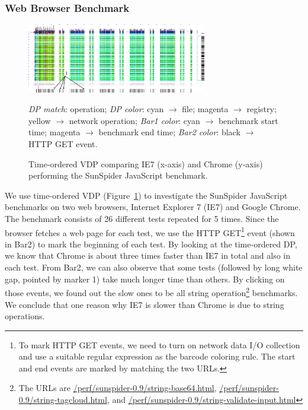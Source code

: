 \subsubsection{Web Browser Benchmark}
\label{sec:wbbench}

\begin{figure}[htb]
\begin{center}
\includegraphics[width=0.7\textwidth]{lviz/wbbench-dp.png}
\end{center}
\caption{Time-ordered VDP comparing IE7 (x-axis) and Chrome (y-axis)
performing the
SunSpider JavaScript benchmark.
}
\label{fig:wbbench-dp}
{\it DP match}: operation;
{\it DP color}: cyan $\rightarrow$ file; magenta $\rightarrow$ registry;
yellow $\rightarrow$ network operation;
{\it Bar1 color}: cyan $\rightarrow$ benchmark start time;
magenta $\rightarrow$ benchmark end time;
{\it Bar2 color}: black $\rightarrow$ HTTP GET event.
\end{figure}

We use time-ordered VDP (Figure~\ref{fig:wbbench-dp}) to investigate the
SunSpider JavaScript benchmarks on
two web browsers, Internet Explorer 7 (IE7) and Google Chrome.
The benchmark consists of 26 different tests repeated for 5 times.
Since the browser fetches a web page for each test,
we use the HTTP GET\footnote{
To mark HTTP GET events, we need to turn on network data I/O collection
and use a suitable regular expression as the barcode coloring rule.
The start and end events are marked by matching the two URLs.
}
event (shown in Bar2) to mark the beginning
of each test.
By looking at the time-ordered DP, we know that Chrome is about three
times faster than IE7 in total and also in each test.
From Bar2,
we can also observe that some tests (followed by long white gap,
pointed by marker 1) take much longer time than others.
By clicking on those events, we found out the slow ones to be all string
operation\footnote{
The URLs are \url{/perf/sunspider-0.9/string-base64.html},
\url{/perf/sunspider-0.9/string-tagcloud.html},
and \url{/perf/sunspider-0.9/string-validate-input.html}}
benchmarks.
We conclude that one reason why IE7 is slower than Chrome is due to string operations.
